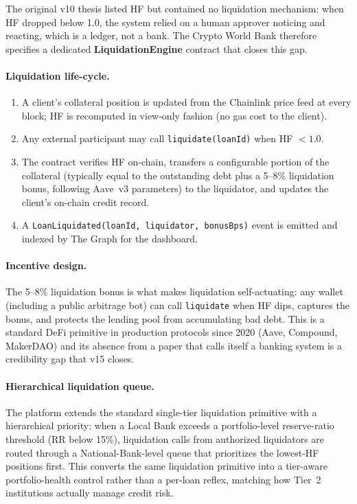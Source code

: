 \documentclass[12pt,a4paper]{report}
\begin{document}
The original v10 thesis listed HF but contained no liquidation mechanism: when HF dropped below 1.0, the system relied on a human approver noticing and reacting, which is a ledger, not a bank. The Crypto World Bank therefore specifies a dedicated \textbf{LiquidationEngine} contract that closes this gap.

\paragraph{Liquidation life-cycle.}
\begin{enumerate}[noitemsep]
\item A client's collateral position is updated from the Chainlink price feed at every block; HF is recomputed in view-only fashion (no gas cost to the client).
\item Any external participant may call \texttt{liquidate(loanId)} when HF $< 1.0$.
\item The contract verifies HF on-chain, transfers a configurable portion of the collateral (typically equal to the outstanding debt plus a 5--8\% liquidation bonus, following Aave~v3 parameters) to the liquidator, and updates the client's on-chain credit record.
\item A \texttt{LoanLiquidated(loanId, liquidator, bonusBps)} event is emitted and indexed by The Graph for the dashboard.
\end{enumerate}

\paragraph{Incentive design.}
The 5--8\% liquidation bonus is what makes liquidation self-actuating: any wallet (including a public arbitrage bot) can call \texttt{liquidate} when HF dips, captures the bonus, and protects the lending pool from accumulating bad debt. This is a standard DeFi primitive in production protocols since 2020 (Aave, Compound, MakerDAO) and its absence from a paper that calls itself a banking system is a credibility gap that v15 closes.

\paragraph{Hierarchical liquidation queue.}
The platform extends the standard single-tier liquidation primitive with a hierarchical priority: when a Local Bank exceeds a portfolio-level reserve-ratio threshold (RR below 15\%), liquidation calls from authorized liquidators are routed through a National-Bank-level queue that prioritizes the lowest-HF positions first. This converts the same liquidation primitive into a tier-aware portfolio-health control rather than a per-loan reflex, matching how Tier~2 institutions actually manage credit risk.
\end{document}
